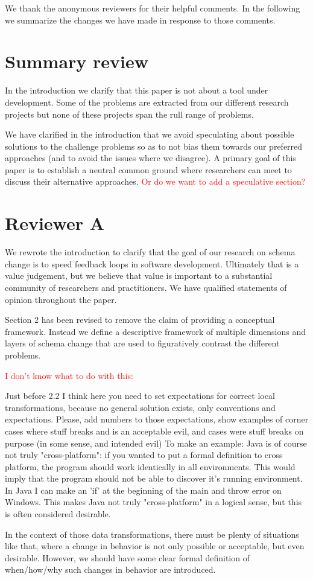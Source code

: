 \documentclass{article}
\begin{document}
We thank the anonymous reviewers for their helpful comments. In the following we summarize the changes we have made in response to those comments.

\section{Summary review}

In the introduction we clarify that this paper is not about a tool under development. Some of the problems are extracted from our different research projects but none of these projects span the rull range of problems.

We have clarified in the introduction that we avoid speculating about possible solutions to the challenge problems so as to not bias them towards our preferred approaches (and to avoid the issues where we disagree). A primary goal of this paper is to establish a neutral common ground where researchers can meet to discuss their alternative approaches.
\textcolor{red}{Or do we want to add a speculative section?}

\section{Reviewer A}

We rewrote the introduction to clarify that the goal of our research on schema change is to speed feedback loops in software development. Ultimately that is a value judgement, but we believe that value is important to a substantial community of researchers and practitioners. We have qualified statements of opinion throughout the paper.

Section 2 has been revised to remove the claim of providing a conceptual framework. Instead we define a descriptive framework of multiple dimensions and layers of schema change that are used to figuratively contrast the different problems.

\textcolor{red}{I don't know what to do with this:}
\begin{displayquote}
  Just before 2.2 I think here you need to set expectations for correct local transformations, because no general solution exists, only conventions and expectations. Please, add numbers to those expectations, show examples of corner cases where stuff breaks and is an acceptable evil, and cases were stuff breaks on purpose (in some sense, and intended evil) To make an example: Java is of course not truly "cross-platform": if you wanted to put a formal definition to cross platform, the program should work identically in all environments. This would imply that the program should not be able to discover it's running environment. In Java I can make an 'if' at the beginning of the main and throw error on Windows. This makes Java not truly "cross-platform" in a logical sense, but this is often considered desirable.

  In the context of those data transformations, there must be plenty of situations like that, where a change in behavior is not only possible or acceptable, but even desirable. However, we should have some clear formal definition of when/how/why such changes in behavior are introduced.
\end{displayquote}
\end{document}

